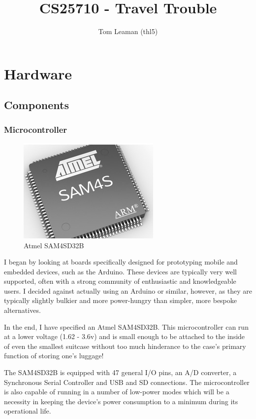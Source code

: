 \documentclass[a4paper, twoside]{article}
\title{CS25710 - Travel Trouble}
\author{Tom Leaman (thl5)}
\begin{document}
\maketitle
\newpage

\section{Hardware}

\subsection{Components}

\subsubsection{Microcontroller}
\begin{figure}
	\vspace{-18pt}
	\begin{center}
		\includegraphics[scale=0.25]{images/atmel_sam4sd32.jpg}
	\end{center}
	\caption{Atmel SAM4SD32B}
\end{figure}

I began by looking at boards specifically designed for prototyping mobile and
embedded devices, such as the Arduino. These devices are typically very well supported,
often with a strong community of enthusiastic and knowledgeable users. I decided against
actually using an Arduino or similar, however, as they are typically slightly
bulkier and more power-hungry than simpler, more bespoke alternatives.

In the end, I have specified an Atmel SAM4SD32B. This microcontroller can run at
a lower voltage (1.62 - 3.6v) and is small enough to be attached to the
inside of even the smallest suitcase without too much hinderance to the case's
primary function of storing one's luggage!

The SAM4SD32B is equipped with 47 general I/O pins, an A/D converter, a
Synchronous Serial Controller and USB and SD connections. The microcontroller is
also capable of running in a number of low-power modes which will be a necessity
in keeping the device's power consumption to a minimum during its operational
life.
\end{document}
